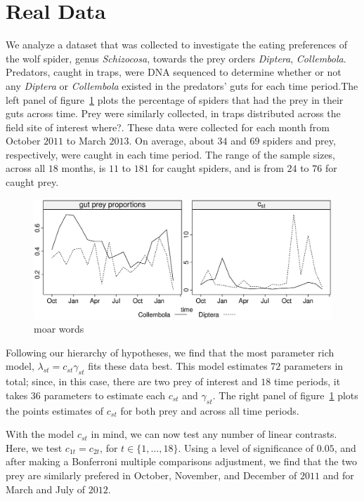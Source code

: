 \section{Real Data}
\label{sec:data}

We analyze a dataset that was collected to investigate the eating preferences of the wolf spider, genus \textit{Schizocosa}, towards the prey orders \textit{Diptera}, \textit{Collembola}.  Predators, caught in traps, were DNA sequenced to determine whether or not any \textit{Diptera} or \textit{Collembola} existed in the predators' guts for each time period.The left panel of figure~\ref{fig:gutP} plots the percentage of spiders that had the prey in their guts across time.  Prey were similarly collected, in traps distributed across the field site of interest {\color{red} where?}.  These data were collected for each month from October $2011$ to March $2013$.  On average, about $34$ and $69$ spiders and prey, respectively, were caught in each time period.  The range of the sample sizes, across all $18$ months, is $11$ to $181$ for caught spiders, and is from $24$ to $76$ for caught prey.  

\begin{figure}
  \centering
  \includegraphics[scale=0.5]{time}
  \caption{moar words}
  \label{fig:gutP}
\end{figure}


 Following our hierarchy of hypotheses, we find that the most parameter rich model, $\lambda_{st} = c_{st} \gamma_{st}$ fits these data best.  This model estimates $72$ parameters in total; since, in this case, there are two prey of interest and $18$ time periods, it takes $36$ parameters to estimate each $c_{st}$ and $\gamma_{st}$.  The right panel of figure~\ref{fig:gutP} plots the points estimates of $c_{st}$ for both prey and across all time periods.  

With the model $c_{st}$ in mind, we can now test any number of linear contrasts.  Here, we test $c_{1t} = c_{2t}$, for $t \in \{1, \ldots, 18\}$.  Using a level of significance of $0.05$, and after making a Bonferroni multiple comparisons adjustment, we find that the two prey are similarly prefered in October, November, and December of $2011$ and for March and July of $2012$.  


